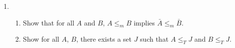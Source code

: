 \documentclass[11pt]{article}
\begin{document}
\begin{enumerate}
\item 
\begin{enumerate}
	\item Show that for all $A$ and $B$,  $A \leq_m B$ implies $\bar{A} \leq_m \bar{B}$.
	\item Show for all $A$, $B$, there exists a set  $J$ such that 
		$A\leq_T J$ and $B\leq_T J$.	

\end{enumerate}

\end{enumerate}
\end{document}
